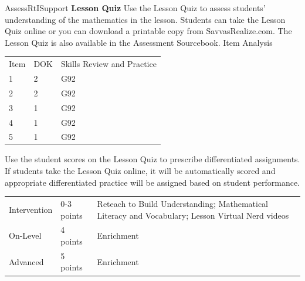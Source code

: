 \documentclass{article}
\newenvironment{te-addendum}[2]{}{}     %
\begin{document}
\begin{te-addendum}{Assess}{RtISupport}
\textbf{Lesson Quiz}
Use the Lesson Quiz to assess students' understanding of the mathematics in the lesson.
Students can take the Lesson Quiz online or you can download a printable copy from SavvasRealize.com. The Lesson Quiz is also available in the Assessment Sourcebook.
Item Analysis
\begin{tabular}{lll}
Item & DOK & Skills Review and Practice \\
1 & 2 & G92 \\
2 & 2 & G92 \\
3 & 1 & G92 \\
4 & 1 & G92 \\
5 & 1 & G92 \\
\end{tabular}
Use the student scores on the Lesson Quiz to prescribe differentiated assignments.
If students take the Lesson Quiz online, it will be automatically scored and appropriate differentiated practice will be assigned based on student performance.
\begin{tabular}{lll}
Intervention & 0-3 points & Reteach to Build Understanding; Mathematical Literacy and Vocabulary; Lesson Virtual Nerd videos \\
On-Level & 4 points & Enrichment \\
Advanced & 5 points & Enrichment \\
\end{tabular}
\end{te-addendum}
\end{document}
